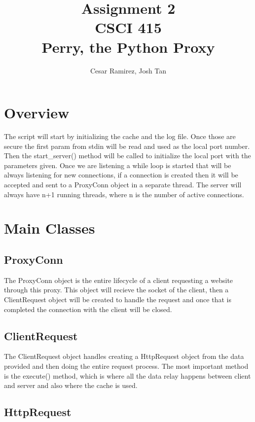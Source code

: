 \documentclass{report}
\title{Assignment 2\\CSCI 415\\Perry, the Python Proxy}
\author{Cesar Ramirez, Josh Tan}
\begin{document}
\maketitle

\section*{Overview}

The script will start by initializing the  cache and the log file. Once those are secure the first 
param from stdin will be read and used as the local port number. Then the start\_server() method will be 
called to initialize the local port with the parameters given. Once we are listening a while loop is 
started that will be always listening for new connections, if a connection is created then it will be 
accepted and sent to a ProxyConn object in a separate thread. The server will always have n+1 running 
threads, where n is the number of active connections.  

\section*{Main Classes}

\subsection*{ProxyConn}

The ProxyConn object is the entire lifecycle of a client requesting a website through this proxy. This object will recieve the socket of the client, then a ClientRequest object will be created to handle the request and once that is completed the connection with the client will be closed.

\subsection*{ClientRequest}

The ClientRequest object handles creating a HttpRequest object from the data provided and then doing the entire request process. The most important method is the execute() method, which is where all the data relay happens between client and server and also where the cache is used.

\subsection*{HttpRequest}
\end{document}
